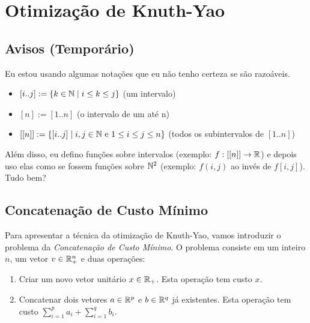 
\chapter{Otimização de Knuth-Yao} %

\label{Knuth-Yao} %


\section{Avisos (Temporário)}

Eu estou usando algumas notações que eu não tenho certeza se são razoáveis.
\begin{itemize}
\item $[i..j] := \{k \in \mathbb{N} \mid i \leq k \leq j\}$ (um intervalo)
\item $[n] := [1..n]$ (o intervalo de um até n)
\item $[[n]] := \{[i..j] \mid i,j \in \mathbb{N} \text{ e } 1 \leq i \leq j \leq n\}$ (todos os subintervalos de $[1..n]$)
\end{itemize}  

Além disso, eu defino funções sobre intervalos (exemplo: $f : [[n]] \to \mathbb{R}$) e depois uso elas como se fossem funções sobre $\mathbb{N}^2$ (exemplo: $f(i,j)$ ao invés de $f[i,j]$). Tudo bem?


\section{Concatenação de Custo Mínimo}

Para apresentar a técnica da otimização de Knuth-Yao, vamos introduzir o problema da \textit{Concatenação de Custo Mínimo}. O problema consiste em um inteiro $n$, um vetor $v \in \mathbb{R}^n_+$ e duas operações:

\begin{enumerate}
\item Criar um novo vetor unitário $x \in \mathbb{R}_+$. Esta operação tem custo $x$.
\item Concatenar dois vetores $a \in \mathbb{R}^p$ e $b \in \mathbb{R}^q$ já existentes. Esta operação tem custo $\sum \limits_{i=1}^p a_i + \sum \limits_{i=1}^q b_i$.
\end{enumerate}

